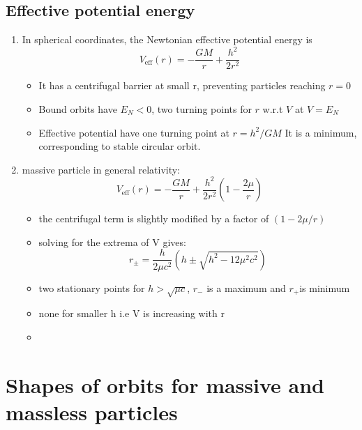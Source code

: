 \documentclass[12pt,a4paper]{article}
\begin{document}
    \subsection{Effective potential energy}
        \begin{enumerate}
            \item In spherical coordinates, the Newtonian effective potential energy is 
            \begin{equation}
                V_{\text{eff}}(r) = -\frac{GM}{r}+\frac{h^2}{2r^2}
            \end{equation}
            \begin{itemize}
                \item It has a centrifugal barrier at small r, preventing particles reaching $r=0 $
                \item Bound orbits have $E_N < 0$, two turning points for $r$ w.r.t $V$ at $V=E_N$
                \item Effective potential have one turning point at $r=h^2/GM$ It is a minimum, corresponding to stable circular orbit.
            \end{itemize}
            \item massive  particle in general relativity:
            \begin{equation}
                V_{\text{eff}}(r) = -\frac{GM}{r}+\frac{h^2}{2r^2}(1-\frac{2\mu}{r})
            \end{equation}
            \begin{itemize}
                \item the centrifugal term is slightly modified by a factor of $(1-2\mu/r)$
                \item solving for the extrema of V gives:
                \begin{equation}
                    r_{\pm}=\frac{h}{2\mu c^2}(h\pm\sqrt{h^2-12\mu^2 c^2})
                \end{equation}
                \item two stationary points for $h>\sqrt{\mu c}$, $r_{-}$ is a maximum and $r_{+}$is minimum
                \item none for smaller h i.e V is increasing with r
                \item 
            \end{itemize}

        \end{enumerate}
        

\section{Shapes of orbits for massive and massless particles}
\end{document}
